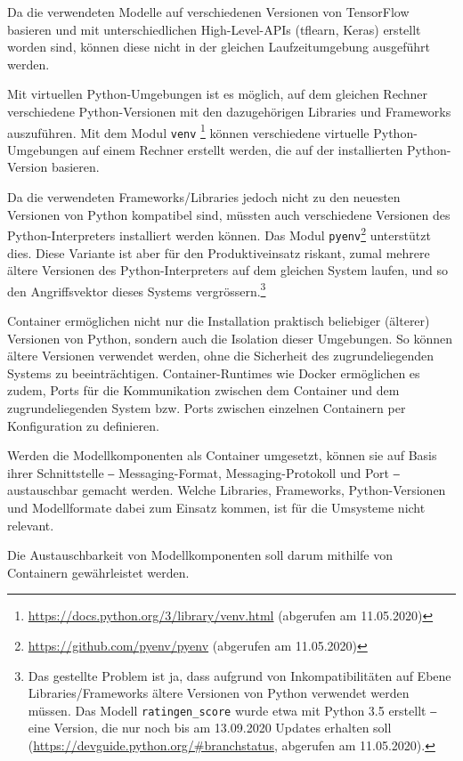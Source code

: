 Da die verwendeten Modelle auf verschiedenen Versionen von TensorFlow basieren und mit unterschiedlichen High-Level-APIs (tflearn, Keras) erstellt worden sind, können diese nicht in der gleichen Laufzeitumgebung ausgeführt werden.

Mit virtuellen Python-Umgebungen ist es möglich, auf dem gleichen Rechner verschiedene Python-Versionen mit den dazugehörigen Libraries und Frameworks auszuführen. Mit dem Modul \texttt{venv} \footnote{\url{https://docs.python.org/3/library/venv.html} (abgerufen am 11.05.2020)} können verschiedene virtuelle Python-Um\-ge\-bung\-en auf einem Rechner erstellt werden, die auf der installierten Python-Version basieren.

Da die verwendeten Frameworks/Libraries jedoch nicht zu den neuesten Versionen von Python kompatibel sind, müssten auch verschiedene Versionen des Python-In\-ter\-pret\-ers installiert werden können. Das Modul \texttt{pyenv}\footnote{\url{https://github.com/pyenv/pyenv} (abgerufen am 11.05.2020)} unterstützt dies. Diese Variante ist aber für den Produktiveinsatz riskant, zumal mehrere ältere Versionen des Python-Interpreters auf dem gleichen System laufen, und so den Angriffsvektor dieses Systems vergrössern.\footnote{Das gestellte Problem ist ja, dass aufgrund von Inkompatibilitäten auf Ebene Libraries/Frameworks ältere Versionen von Python verwendet werden müssen. Das Modell \texttt{ratingen\_score} wurde etwa mit Python 3.5 erstellt ‒ eine Version, die nur noch bis am 13.09.2020 Updates erhalten soll (\url{https://devguide.python.org/\#branchstatus}, abgerufen am 11.05.2020).}

Container ermöglichen nicht nur die Installation praktisch beliebiger (älterer) Versionen von Python, sondern auch die Isolation dieser Umgebungen. So können ältere Versionen verwendet werden, ohne die Sicherheit des zugrundeliegenden Systems zu beeinträchtigen. Container-Runtimes wie Docker ermöglichen es zudem, Ports für die Kommunikation zwischen dem Container und dem zugrundeliegenden System bzw. Ports zwischen einzelnen Containern per Konfiguration zu definieren.

Werden die Modellkomponenten als Container umgesetzt, können sie auf Basis ihrer Schnittstelle ‒ Messaging-Format, Messaging-Protokoll und Port ‒ austauschbar gemacht werden. Welche Libraries, Frameworks, Python-Versionen und Modellformate dabei zum Einsatz kommen, ist für die Umsysteme nicht relevant.

Die Austauschbarkeit von Modellkomponenten soll darum mithilfe von Containern gewährleistet werden.

